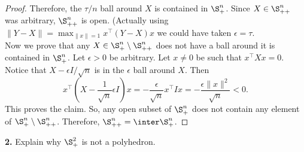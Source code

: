 \documentclass[../borwein-lewis_notes.tex]{subfiles}
\begin{document}
\begin{proof}
Therefore, the $\tau/n$ ball around $X$ is contained in $\S_+^n$. 
Since $X\in\S_{++}^n$ was arbitrary, $\S_{++}^n$ is open.
(Actually using $\|Y-X\| = 
\max_{\|x\|=1} x^\top(Y-X)x$
 we could have taken $\epsilon=\tau$.\\
Now we prove that any $X\in\S_+^n\setminus \S_{++}^n$ does not have 
a ball around it is contained in $\S_+^n$. Let $\epsilon>0$ be arbitrary.
Let $x\neq 0$ be such that $x^\top X x = 0$. Notice that 
$X-\epsilon I/\sqrt{n}$ is in the $\epsilon$ ball around $X$. Then 
\begin{equation*}
x^\top (X-\frac{1}{\sqrt{n}}\epsilon I)x = -\frac{\epsilon
}{\sqrt{n}}x^\top I x = -\frac{\epsilon \|x\|^2}{\sqrt{n}} < 0.
\end{equation*}
This proves the claim. So, any open subset of $\S_+^n$ does not 
contain any element of $\S_{+}^n\setminus \S_{++}^n$. Therefore, 
$\S_{++}^n = \inter \S_+^n$.
\end{proof}
\noindent\textbf{2.} Explain why $\S_+^2$ is not a polyhedron. 
\end{document}
